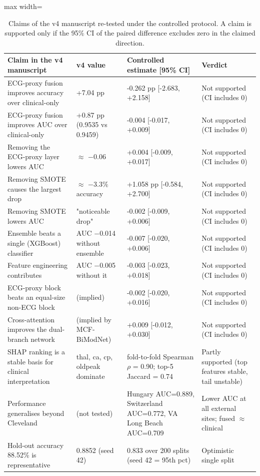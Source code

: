\begin{table}[!t]
\centering
\scriptsize
\caption{Claims of the v4 manuscript re-tested under the controlled protocol. A claim is supported only if the 95\% CI of the paired difference excludes zero in the claimed direction.}
\label{tab:verdict}
\setlength{\tabcolsep}{3pt}
\begin{adjustbox}{max width=\linewidth}
\begin{tabular}{p{4.6cm}p{2.6cm}p{5.6cm}p{3.6cm}}
\toprule
Claim in the v4 manuscript & v4 value & Controlled estimate [95\% CI] & Verdict \\
\midrule
ECG-proxy fusion improves accuracy over clinical-only & +7.04 pp & -0.262 pp [-2.683, +2.158] & Not supported (CI includes 0) \\
ECG-proxy fusion improves AUC over clinical-only & +0.87 pp (0.9535 vs 0.9459) & -0.004 [-0.017, +0.009] & Not supported (CI includes 0) \\
Removing the ECG-proxy layer lowers AUC & $\approx$ $-$0.06 & +0.004 [-0.009, +0.017] & Not supported (CI includes 0) \\
Removing SMOTE causes the largest drop & $\approx$ $-$3.3\% accuracy & +1.058 pp [-0.584, +2.700] & Not supported (CI includes 0) \\
Removing SMOTE lowers AUC & "noticeable drop" & -0.002 [-0.009, +0.006] & Not supported (CI includes 0) \\
Ensemble beats a single (XGBoost) classifier & AUC $-$0.014 without ensemble & -0.007 [-0.020, +0.006] & Not supported (CI includes 0) \\
Feature engineering contributes & AUC $-$0.005 without it & -0.003 [-0.023, +0.018] & Not supported (CI includes 0) \\
ECG-proxy block beats an equal-size non-ECG block & (implied) & -0.002 [-0.020, +0.016] & Not supported (CI includes 0) \\
Cross-attention improves the dual-branch network & (implied by MCF-BiModNet) & +0.009 [-0.012, +0.030] & Not supported (CI includes 0) \\
SHAP ranking is a stable basis for clinical interpretation & thal, ca, cp, oldpeak dominate & fold-to-fold Spearman $\rho$ = 0.90; top-5 Jaccard = 0.74 & Partly supported (top features stable, tail unstable) \\
Performance generalises beyond Cleveland & (not tested) & Hungary AUC=0.889, Switzerland AUC=0.772, VA Long Beach AUC=0.709 & Lower AUC at all external sites; fused $\approx$ clinical \\
Hold-out accuracy 88.52\% is representative & 0.8852 (seed 42) & 0.833 over 200 splits (seed 42 = 95th pct) & Optimistic single split \\
\bottomrule
\end{tabular}
\end{adjustbox}
\end{table}
